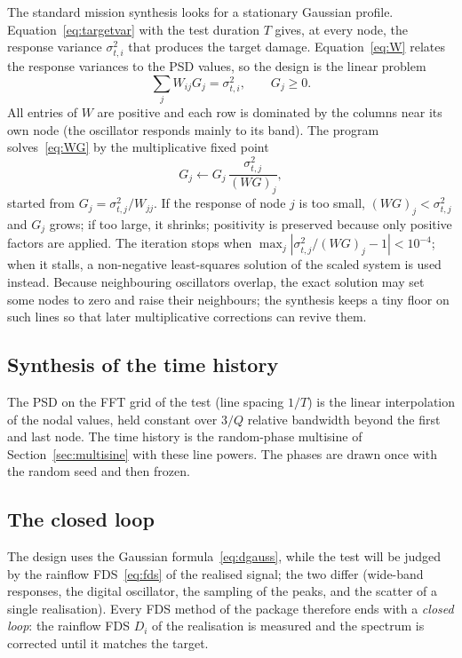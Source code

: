 The standard mission synthesis looks for a stationary Gaussian profile. Equation~\eqref{eq:targetvar}
with the test duration $T$ gives, at every node, the response variance $\sigma^2_{t,i}$ that produces
the target damage. Equation~\eqref{eq:W} relates the response variances to the PSD values, so the
design is the linear problem
\begin{equation}\label{eq:WG}
  \sum_j W_{ij}G_j = \sigma^2_{t,i}, \qquad G_j\ge0 .
\end{equation}
All entries of $W$ are positive and each row is dominated by the columns near its own node (the
oscillator responds mainly to its band). The program solves~\eqref{eq:WG} by the multiplicative
fixed point
\begin{equation}\label{eq:multfix}
  G_j \leftarrow G_j\,\frac{\sigma^2_{t,j}}{(WG)_j},
\end{equation}
started from $G_j = \sigma^2_{t,j}/W_{jj}$. If the response of node $j$ is too small,
$(WG)_j<\sigma^2_{t,j}$ and $G_j$ grows; if too large, it shrinks; positivity is preserved because
only positive factors are applied. The iteration stops when $\max_j|\sigma^2_{t,j}/(WG)_j - 1| <
10^{-4}$; when it stalls, a non-negative least-squares solution of the scaled system is used instead.
Because neighbouring oscillators overlap, the exact solution may set some nodes to zero and raise
their neighbours; the synthesis keeps a tiny floor on such lines so that later multiplicative
corrections can revive them.

\subsection{Synthesis of the time history}

The PSD on the FFT grid of the test (line spacing $1/T$) is the linear interpolation of the nodal
values, held constant over $3/Q$ relative bandwidth beyond the first and last node. The time history
is the random-phase multisine of Section~\ref{sec:multisine} with these line powers. The phases are
drawn once with the random seed and then frozen.

\subsection{The closed loop}\label{sec:closedloop}

The design uses the Gaussian formula~\eqref{eq:dgauss}, while the test will be judged by the rainflow
FDS~\eqref{eq:fds} of the realised signal; the two differ (wide-band responses, the digital oscillator,
the sampling of the peaks, and the scatter of a single realisation). Every FDS method of the package
therefore ends with a \emph{closed loop}: the rainflow FDS $D_i$ of the realisation is measured and the
spectrum is corrected until it matches the target.


